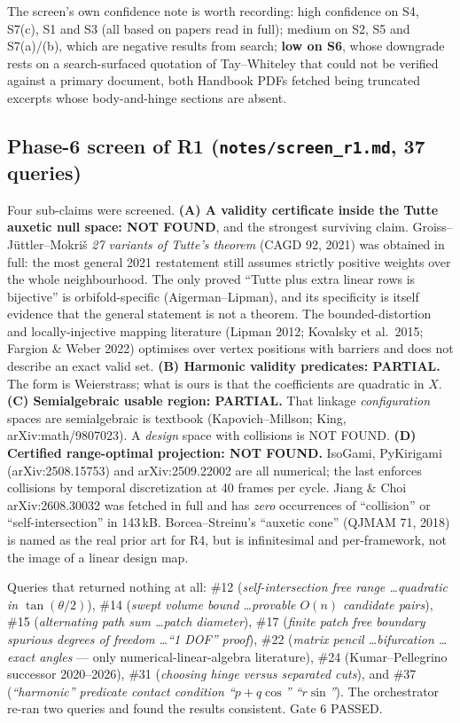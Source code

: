 \documentclass[10pt,a4paper]{article}
\begin{document}
The screen's own confidence note is worth recording: high confidence on S4, S7(c), S1 and S3
(all based on papers read in full); medium on S2, S5 and S7(a)/(b), which are negative results
from search; \textbf{low on S6}, whose downgrade rests on a search-surfaced quotation of
Tay--Whiteley that could not be verified against a primary document, both Handbook PDFs
fetched being truncated excerpts whose body-and-hinge sections are absent.

\subsection{Phase-6 screen of R1 (\texttt{notes/screen\_r1.md}, 37 queries)}

Four sub-claims were screened.
\textbf{(A) A validity certificate inside the Tutte auxetic null space: NOT FOUND}, and the
strongest surviving claim. Groiss--J\"uttler--Mokri\v{s} \emph{27 variants of Tutte's theorem}
(CAGD 92, 2021) was obtained in full: the most general 2021 restatement still assumes strictly
positive weights over the whole neighbourhood. The only proved ``Tutte plus extra linear rows
is bijective'' is orbifold-specific (Aigerman--Lipman), and its specificity is itself evidence
that the general statement is not a theorem. The bounded-distortion and locally-injective
mapping literature (Lipman 2012; Kovalsky et al.\ 2015; Fargion \& Weber 2022) optimises over
vertex positions with barriers and does not describe an exact valid set.
\textbf{(B) Harmonic validity predicates: PARTIAL.} The form is Weierstrass; what is ours is
that the coefficients are quadratic in $X$.
\textbf{(C) Semialgebraic usable region: PARTIAL.} That linkage \emph{configuration} spaces are
semialgebraic is textbook (Kapovich--Millson; King, arXiv:math/9807023). A \emph{design} space
with collisions is NOT FOUND.
\textbf{(D) Certified range-optimal projection: NOT FOUND.} IsoGami, PyKirigami
(arXiv:2508.15753) and arXiv:2509.22002 are all numerical; the last enforces collisions by
temporal discretization at 40 frames per cycle. Jiang \& Choi arXiv:2608.30032 was fetched in
full and has \emph{zero} occurrences of ``collision'' or ``self-intersection'' in 143\,kB.
Borcea--Streinu's ``auxetic cone'' (QJMAM 71, 2018) is named as the real prior art for R4, but
is infinitesimal and per-framework, not the image of a linear design map.

Queries that returned nothing at all: \#12 (\emph{self-intersection free range \dots quadratic
in $\tan(\theta/2)$}), \#14 (\emph{swept volume bound \dots provable $O(n)$ candidate pairs}),
\#15 (\emph{alternating path sum \dots patch diameter}), \#17 (\emph{finite patch free boundary
spurious degrees of freedom \dots ``1 DOF'' proof}), \#22 (\emph{matrix pencil \dots bifurcation
\dots exact angles} --- only numerical-linear-algebra literature), \#24 (Kumar--Pellegrino
successor 2020--2026), \#31 (\emph{choosing hinge versus separated cuts}), and \#37
(\emph{``harmonic'' predicate contact condition ``$p+q\cos$'' ``$r\sin$''}).
The orchestrator re-ran two queries and found the results consistent. Gate 6 PASSED.
\end{document}
